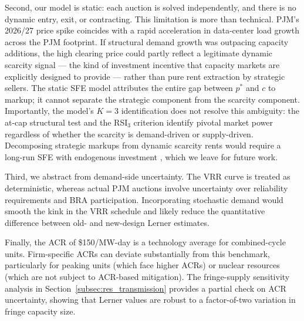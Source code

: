 Second, our model is static: each auction is solved independently, and there
is no dynamic entry, exit, or contracting. This limitation is more than
technical. PJM's 2026/27 price spike coincides with a rapid acceleration in
data-center load growth across the PJM footprint. If structural demand growth
was outpacing capacity additions, the high clearing price could partly reflect
a legitimate dynamic scarcity signal --- the kind of investment incentive
that capacity markets are explicitly designed to provide --- rather than pure
rent extraction by strategic sellers. The static SFE model attributes the
entire gap between $p^*$ and $c$ to markup; it cannot separate the strategic
component from the scarcity component. Importantly, the model's $K = 3$
identification does not resolve this ambiguity: the at-cap structural test
and the RSI$_3$ criterion identify pivotal market power regardless of whether
the scarcity is demand-driven or supply-driven. Decomposing strategic markups
from dynamic scarcity rents would require a long-run SFE with endogenous
investment \citep{Joskow2007_capacity}, which we leave for future work.

Third, we abstract from demand-side uncertainty. The VRR curve is treated as
deterministic, whereas actual PJM auctions involve uncertainty over reliability
requirements and BRA participation. Incorporating stochastic demand would
smooth the kink in the VRR schedule and likely reduce the quantitative
difference between old- and new-design Lerner estimates.

Finally, the ACR of \$150/MW-day is a technology average for combined-cycle
units. Firm-specific ACRs can deviate substantially from this benchmark,
particularly for peaking units (which face higher ACRs) or nuclear resources
(which are not subject to ACR-based mitigation). The fringe-supply sensitivity
analysis in Section~\ref{subsec:res_transmission} provides a partial check on
ACR uncertainty, showing that Lerner values are robust to a factor-of-two
variation in fringe capacity size.
